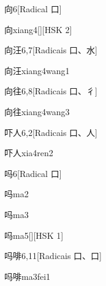\begin{entry}{向}{6}[Radical ⼝]
  \begin{phonetics}{向}{xiang4}[][HSK 2]
  \end{phonetics}
\end{entry}

\begin{entry}{向汪}{6,7}[Radicais ⼝、⽔]
  \begin{phonetics}{向汪}{xiang4wang1}
  \end{phonetics}
\end{entry}

\begin{entry}{向往}{6,8}[Radicais ⼝、⼻]
  \begin{phonetics}{向往}{xiang4wang3}
  \end{phonetics}
\end{entry}

\begin{entry}{吓人}{6,2}[Radicais ⼝、⼈]
  \begin{phonetics}{吓人}{xia4ren2}
  \end{phonetics}
\end{entry}

\begin{entry}{吗}{6}[Radical ⼝]
  \begin{phonetics}{吗}{ma2}
  \end{phonetics}
  \begin{phonetics}{吗}{ma3}
  \end{phonetics}
  \begin{phonetics}{吗}{ma5}[][HSK 1]
  \end{phonetics}
\end{entry}

\begin{entry*}{吗啡}{6,11}[Radicais ⼝、⼝]
  \begin{phonetics}{吗啡}{ma3fei1}
  \end{phonetics}
\end{entry*}

